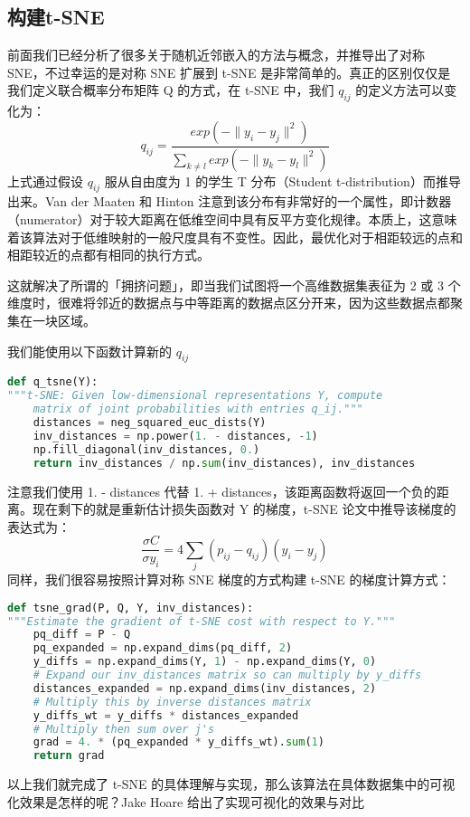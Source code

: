 \subsection{构建t-SNE}
前面我们已经分析了很多关于随机近邻嵌入的方法与概念，并推导出了对称 SNE，不过幸运的是对称 SNE 扩展到 t-SNE 是非常简单的。真正的区别仅仅是我们定义联合概率分布矩阵 Q 的方式，在 t-SNE 中，我们 $q_{ij}$ 的定义方法可以变化为：
\begin{equation}\label{eq:sne10}
q_{ij}=\frac{exp(-\|y_i-y_j\|^2)}{\sum_{k\neq l}exp(-\|y_k-y_l\|^2)}
\end{equation}
上式通过假设 $q_{ij}$ 服从自由度为 1 的学生 T 分布（Student t-distribution）而推导出来。Van der Maaten 和 Hinton 注意到该分布有非常好的一个属性，即计数器（numerator）对于较大距离在低维空间中具有反平方变化规律。本质上，这意味着该算法对于低维映射的一般尺度具有不变性。因此，最优化对于相距较远的点和相距较近的点都有相同的执行方式。

这就解决了所谓的「拥挤问题」，即当我们试图将一个高维数据集表征为 2 或 3 个维度时，很难将邻近的数据点与中等距离的数据点区分开来，因为这些数据点都聚集在一块区域。

我们能使用以下函数计算新的 $q_{ij}$
\begin{lstlisting}[language=Python]
def q_tsne(Y):    
"""t-SNE: Given low-dimensional representations Y, compute
    matrix of joint probabilities with entries q_ij."""
    distances = neg_squared_euc_dists(Y)    
    inv_distances = np.power(1. - distances, -1)
    np.fill_diagonal(inv_distances, 0.)    
    return inv_distances / np.sum(inv_distances), inv_distances
\end{lstlisting}
注意我们使用 1. - distances 代替 1. + distances，该距离函数将返回一个负的距离。现在剩下的就是重新估计损失函数对 Y 的梯度，t-SNE 论文中推导该梯度的表达式为：
\begin{equation*}
\frac{\sigma C}{\sigma y_i} = 4\sum_{j}(p_{ij}-q_{ij})(y_i-y_j)
\end{equation*}
同样，我们很容易按照计算对称 SNE 梯度的方式构建 t-SNE 的梯度计算方式：
\begin{lstlisting}[language=Python]
def tsne_grad(P, Q, Y, inv_distances):    
"""Estimate the gradient of t-SNE cost with respect to Y."""
    pq_diff = P - Q    
    pq_expanded = np.expand_dims(pq_diff, 2)    
    y_diffs = np.expand_dims(Y, 1) - np.expand_dims(Y, 0)    
    # Expand our inv_distances matrix so can multiply by y_diffs
    distances_expanded = np.expand_dims(inv_distances, 2)    
    # Multiply this by inverse distances matrix
    y_diffs_wt = y_diffs * distances_expanded    
    # Multiply then sum over j's
    grad = 4. * (pq_expanded * y_diffs_wt).sum(1)    
    return grad 
\end{lstlisting}
以上我们就完成了 t-SNE 的具体理解与实现，那么该算法在具体数据集中的可视化效果是怎样的呢？Jake Hoare 给出了实现可视化的效果与对比
